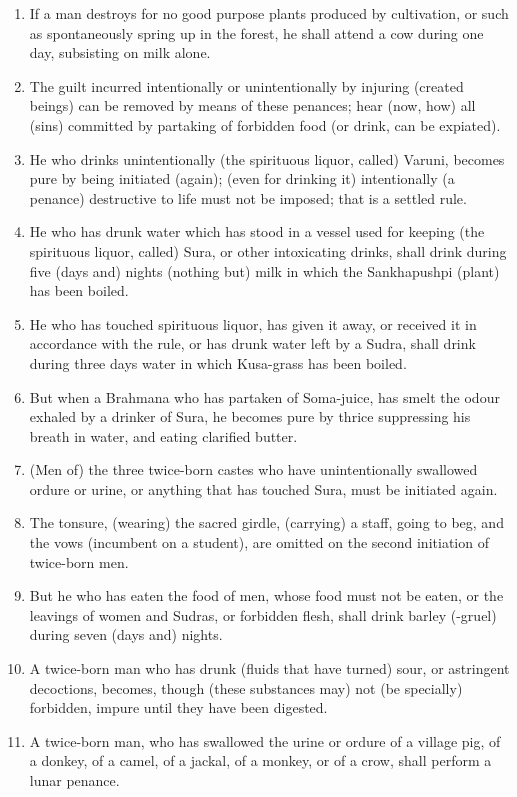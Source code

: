 \begin{enumerate}
\item If a man destroys for no good purpose plants produced by cultivation, or such as spontaneously spring up in the forest, he shall attend a cow during one day, subsisting on milk alone.
\item The guilt incurred intentionally or unintentionally by injuring (created beings) can be removed by means of these penances; hear (now, how) all (sins) committed by partaking of forbidden food (or drink, can be expiated).
\item He who drinks unintentionally (the spirituous liquor, called) Varuni, becomes pure by being initiated (again); (even for drinking it) intentionally (a penance) destructive to life must not be imposed; that is a settled rule.
\item He who has drunk water which has stood in a vessel used for keeping (the spirituous liquor, called) Sura, or other intoxicating drinks, shall drink during five (days and) nights (nothing but) milk in which the Sankhapushpi (plant) has been boiled.
\item He who has touched spirituous liquor, has given it away, or received it in accordance with the rule, or has drunk water left by a Sudra, shall drink during three days water in which Kusa-grass has been boiled.
\item But when a Brahmana who has partaken of Soma-juice, has smelt the odour exhaled by a drinker of Sura, he becomes pure by thrice suppressing his breath in water, and eating clarified butter.
\item (Men of) the three twice-born castes who have unintentionally swallowed ordure or urine, or anything that has touched Sura, must be initiated again.
\item The tonsure, (wearing) the sacred girdle, (carrying) a staff, going to beg, and the vows (incumbent on a student), are omitted on the second initiation of twice-born men.
\item But he who has eaten the food of men, whose food must not be eaten, or the leavings of women and Sudras, or forbidden flesh, shall drink barley (-gruel) during seven (days and) nights.
\item A twice-born man who has drunk (fluids that have turned) sour, or astringent decoctions, becomes, though (these substances may) not (be specially) forbidden, impure until they have been digested.
\item A twice-born man, who has swallowed the urine or ordure of a village pig, of a donkey, of a camel, of a jackal, of a monkey, or of a crow, shall perform a lunar penance.

\end{enumerate}
